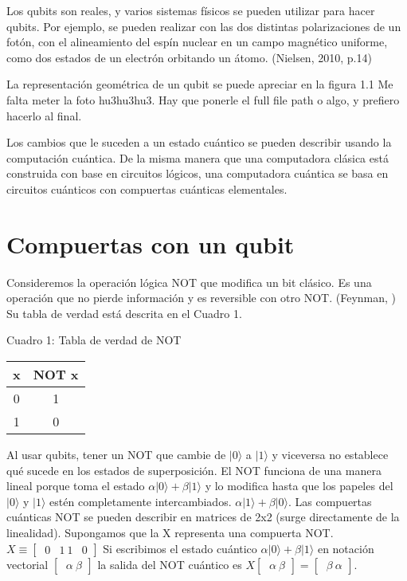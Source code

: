 \documentclass[11pt,a4paper]{article}
\begin{document}
Los qubits son reales, y varios sistemas físicos se pueden utilizar para hacer qubits. Por ejemplo, se pueden realizar con las dos distintas polarizaciones de un fotón, con el alineamiento del espín nuclear en un campo magnético uniforme, como dos estados de un electrón orbitando un átomo. (Nielsen, 2010, p.14) 

La representación geométrica de un qubit se puede apreciar en la figura 1.1
Me falta meter la foto hu3hu3hu3. Hay que ponerle el full file path o algo,  y prefiero hacerlo al final. 

Los cambios que le suceden a un estado cuántico se pueden describir usando la computación cuántica. De la misma manera que una computadora clásica está construida con base en circuitos lógicos, una computadora cuántica se basa en circuitos cuánticos con compuertas cuánticas elementales.
 
\section*{Compuertas con un qubit}
Consideremos la operación lógica NOT que modifica un bit clásico. Es una operación que no pierde información y es reversible con otro NOT. (Feynman, )
Su tabla de verdad está descrita en el Cuadro 1.

Cuadro 1: Tabla de verdad de NOT
\begin{center}
    \begin{tabular}{ c | c }
    x & NOT x \\ 
	\hline
    0 & 1\\ 
    1 & 0 \\ 
    \end{tabular}
\end{center}

Al usar qubits, tener un NOT que cambie de $\vert 0\rangle$ a $\vert 1\rangle$ y viceversa no establece qué sucede en los estados de superposición. 
El NOT funciona de una manera lineal porque toma el estado 
 $\alpha \vert 0\rangle + \beta \vert 1\rangle$
 y lo modifica hasta que los papeles del $\vert 0\rangle$ y $\vert 1\rangle$ estén completamente intercambiados. 
  $\alpha \vert 1\rangle + \beta \vert 0\rangle$. 
Las compuertas cuánticas NOT se pueden describir en matrices de 2x2 (surge directamente de la linealidad). Supongamos que la X representa una compuerta NOT. 
$X \equiv \begin{bmatrix}
		\ 0 & 1
		\ 1 & 0
	      \end{bmatrix}$
Si escribimos el estado cuántico $\alpha \vert 0\rangle + \beta \vert 1\rangle$ en notación vectorial
$
\begin{bmatrix}
 \ \alpha
 \ \beta
 \end{bmatrix}
$
la salida del NOT cuántico es 
$X \begin{bmatrix} 
     \ \alpha
     \ \beta
 \end{bmatrix}
 = \begin{bmatrix}
 \ \beta
 \ \alpha
 \end{bmatrix}$.
 
\end{document}
